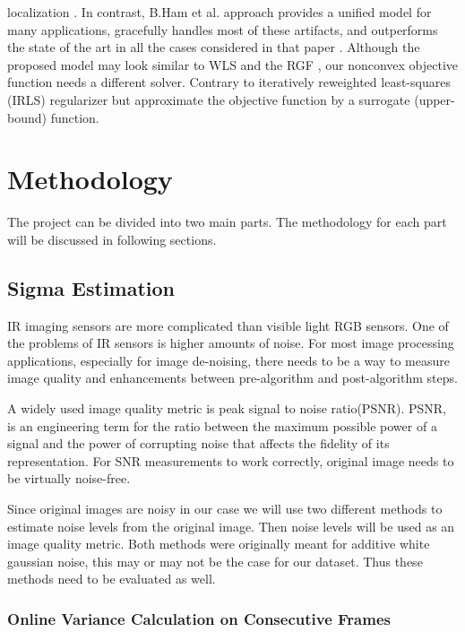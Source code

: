 \documentclass[10pt,twocolumn,letterpaper]{article}
\begin{document}
localization \cite{yan2013cross}. In contrast, B.Ham et al. approach provides a unified model for many applications, gracefully handles most of these artifacts, and outperforms the state of the art in all the cases considered in that paper \cite{ham2015}. Although the proposed model may look similar to WLS \cite{farbman2008edge} and the RGF \cite{yan2013cross}, our nonconvex objective function needs a different solver. Contrary to iteratively reweighted least-squares (IRLS) \cite{daubechies2010iteratively} regularizer but approximate the objective function by a surrogate (upper-bound) function.
\section{Methodology}
The project can be divided into two main parts. The methodology for each part will be discussed in following sections.

\subsection{Sigma Estimation}
IR imaging sensors are more complicated than visible light RGB sensors. One of the problems of IR sensors is higher amounts of noise.
For most image processing applications, especially for image de-noising, there needs to be a way to measure image quality and enhancements between pre-algorithm and post-algorithm steps.

A widely used image quality metric is peak signal to noise ratio(PSNR). PSNR, is an engineering term for the ratio between the maximum possible power of a signal and the power of corrupting noise that affects the fidelity of its representation\cite{psnr-wiki}. For SNR measurements to work correctly, original image needs to be virtually noise-free.

Since original images are noisy in our case we will use two different methods to estimate noise levels from the original image. Then noise levels will be used as an image quality metric. Both methods were originally meant for additive white gaussian noise, this may or may not be the case for our dataset. Thus these methods need to be evaluated as well.
\subsubsection{Online Variance Calculation on Consecutive Frames}
\end{document}
